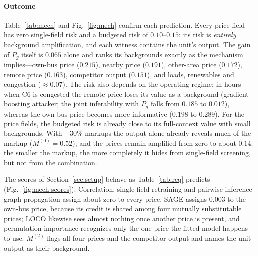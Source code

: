 \paragraph{Outcome}
Table~\ref{tab:mech} and Fig.~\ref{fig:mech} confirm each prediction. Every price field has zero
single-field risk and a budgeted risk of $0.10$--$0.15$: its risk is \emph{entirely} background
amplification, and each witness contains the unit's output. The gain of $P_g$ itself is $0.065$ alone
and ranks its backgrounds exactly as the mechanism implies---own-bus price ($0.215$), nearby price
($0.191$), other-area price ($0.172$), remote price ($0.163$), competitor output ($0.151$), and
loads, renewables and congestion ($\approx0.07$). The risk also depends on the operating regime: in
hours when C6 is congested the remote price loses its value as a background (gradient-boosting attacker; the joint inferability
with $P_g$ falls from $0.185$ to $0.012$), whereas the own-bus price becomes more informative ($0.198$ to
$0.289$). For the price fields, the budgeted risk is already close to its full-context value with small backgrounds.
With $\pm30\%$ markups the output alone already reveals much of the markup ($M^{(0)}=0.52$), and the
prices remain amplified from zero to about $0.14$: the smaller the markup, the more completely it
hides from single-field screening, but not from the combination.

The scores of Section~\ref{sec:setup} behave as Table~\ref{tab:req} predicts (Fig.~\ref{fig:mech-scores}).
Correlation, single-field retraining and pairwise inference-graph propagation assign about zero to
every price. SAGE assigns $0.003$ to the own-bus price, because its credit is shared among four
mutually substitutable prices; LOCO likewise sees almost nothing once another price is present, and
permutation importance recognizes only the one price the fitted model happens to use. $M^{(2)}$ flags
all four prices and the competitor output and names the unit output as their background.

\begin{table}[!t]
\centering\footnotesize
\caption{Controlled mechanism (markup $\pm5\%$): exact field risk over all 2,047 subsets.}\label{tab:mech}
\end{table}

